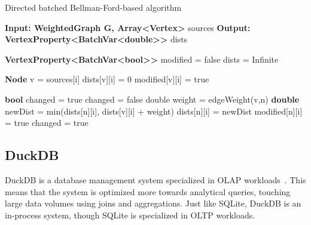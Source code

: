 \begin{algorithm}
\caption{Directed batched Bellman-Ford-based algorithm}
\label{alg:batched-bellman-ford}
\begin{algorithmic}[2]
    \State \textbf{Input: WeightedGraph G, Array<Vertex>} sources
    \State \textbf{Output: VertexProperty<BatchVar<double>\>>} dists
    
    \State \textbf{VertexProperty<BatchVar<bool>\>>} modified = false
    \State dists = Infinite
    
        \State \textbf{Node} v = sources[i]
        \State dists[v][i] = 0
        \State modified[v][i] = true
    \EndFor
    
    \State \textbf{bool} changed = true
        \State changed = false
                    \State double weight = edgeWeight(v,n)
                        \State \textbf{double} newDist = min(dists[n][i], dists[v][i] + weight)
                            \State dists[n][i] = newDist
                            \State modified[n][i] = true
                            \State changed = true
                        \EndIf
                    \EndFor
                \EndFor
            \EndIf
        \EndFor
    \EndWhile
    
 
\end{algorithmic}
\end{algorithm}


\subsection{DuckDB}
DuckDB is a database management system specialized in OLAP workloads~\cite{DBLP:conf/sigmod/RaasveldtM19}.
This means that the system is optimized more towards analytical queries, touching large data volumes using joins and aggregations.
Just like SQLite, DuckDB is an in-process system, though SQLite is specialized in OLTP workloads.


